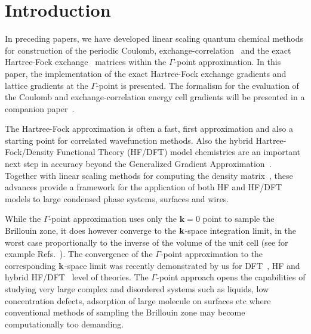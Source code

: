 \documentclass[prl,twocolumn,showpacs,twocolumngrid,superbib]{revtex4}
\begin{document}
\section{Introduction}

In preceding papers, we have developed linear scaling quantum chemical methods
for construction of the periodic Coulomb, exchange-correlation~\cite{CTymczak04a}
and the exact Hartree-Fock exchange~\cite{CTymczak04b} 
matrices within the $\Gamma$-point approximation. 
In this paper, the implementation of the exact Hartree-Fock exchange
gradients and lattice gradients at the $\Gamma$-point is presented. 
The formalism for the evaluation of the Coulomb and 
exchange-correlation energy cell gradients will be presented 
in a companion paper~\cite{CTymczak05}.

The Hartree-Fock approximation is often a fast, first approximation and 
also a starting point for correlated wavefunction methods.
Also the hybrid Hartree-Fock/Density Functional Theory (HF/DFT) model chemistries
are an important next step in accuracy beyond the Generalized Gradient 
Approximation~\cite{Gill92,Becke93,VBarone96,CAdamo99}. Together with linear
scaling methods for computing the density matrix~\cite{ANiklasson02A,ANiklasson03}, these
advances provide a framework for the application of both HF and HF/DFT 
models to large condensed phase systems, surfaces and wires.

While the $\Gamma$-point approximation uses only the $\mathbf{k}=0$ point to sample
the Brillouin zone, it does however converge to the 
${\bf k}$-space integration limit, in the worst case proportionally to the inverse of the volume of 
the unit cell (see for example Refs.~\cite{CKittel71,NAshcroft76}).
The convergence of the $\Gamma$-point approximation to 
the corresponding ${\bf k}$-space limit was recently 
demonstrated by us for DFT~\cite{CTymczak04a}, HF and hybrid 
HF/DFT~\cite{CTymczak04b} level of theories.
The $\Gamma$-point approach opens the capabilities of studying very large 
complex and disordered systems such as liquids, low concentration defects, adsorption of 
large molecule on surfaces etc where conventional methods 
of sampling the Brillouin zone may become computationally too demanding.
\end{document}
